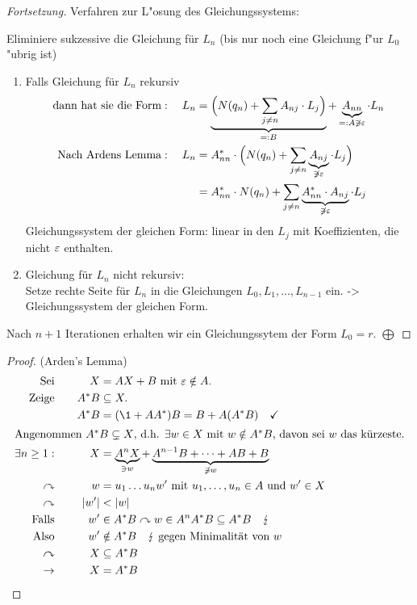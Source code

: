 \begin{proof}[Fortsetzung]
    Verfahren zur L"osung des Gleichungssystems:
    
	Eliminiere sukzessive die Gleichung für $L_n$ (bis nur noch eine Gleichung f"ur $L_0$ "ubrig ist)
	\begin{enumerate}[label=(\arabic*)]
		\item Falls Gleichung für $L_n$ rekursiv
			\begin{align*}
				\text{dann hat sie die Form}:\quad L_n &= \underbrace{\Big( N(q_n)+\sum_{j\neq n} A_{nj}\cdot L_j \Big)}_{=: B} + \underbrace{A_{nn}}_{=: A \not\ni \varepsilon}\cdot L_n\\
				\text{Nach Ardens Lemma}:\quad L_n &= A_{nn}^*\cdot \Big( N(q_n)+\sum_{j\neq n} \underbrace{A_{nj}}_{\not\ni\varepsilon} \cdot L_j \Big)\\
				&= A_{nn}^*\cdot N(q_n) + \sum_{j\neq n} \underbrace{A_{nn}^*\cdot A_{nj}}_{\not\ni\varepsilon} \cdot L_j
			\end{align*}
			Gleichungssystem der gleichen Form: linear in den $L_j$ mit Koeffizienten, die nicht $\varepsilon$ enthalten.
		\item Gleichung für $L_n$ nicht rekursiv:\\
		Setze rechte Seite für $L_n$ in die Gleichungen $L_0, L_1, \dots, L_{n-1}$ ein. \--> Gleichungssystem der gleichen Form.
	\end{enumerate}
    Nach $n+1$ Iterationen erhalten wir ein Gleichungssytem der Form $L_0=r$. \hfill$\bigoplus$
\end{proof}
\begin{proof}(Arden's Lemma)
	\begin{alignat*}{3}
		\text{Sei}&\quad& X&= AX+B\text{ mit }\Eps\notin A.\\
		\text{Zeige}&& A^*B&\subseteq X.\\
		&& A^*B &= (\1+AA^*)B = B+A(A^*B) \quad\checkmark\\
		\shortintertext{Angenommen $A^*B \subsetneq X$, d.h. $\exists w\in X$ mit $w\notin A^*B$, davon sei $w$ das kürzeste.}
		\exists n\geq 1: && X &= \underbrace{A^nX}_{\ni w} + \underbrace{A^{n-1}B+\dots +AB+B}_{\not\ni w}\\
		\curvearrowright && w &= u_1\dots u_n w'\text{ mit } u_1,\dots,u_n\in A\text{ und } w'\in X\\
		\curvearrowright && |w'| &< |w|\\
		\text{Falls}&& w'&\in A^*B \curvearrowright w\in A^nA^*B\subseteq A^*B \quad \lightning\\
		\text{Also} && w'&\notin A^*B \quad\lightning\text{ gegen Minimalität von }w\\
		\curvearrowright && X&\subseteq A^*B\\
		\-> && X &= A^*B \tag*{\qedhere}
	\end{alignat*}
\end{proof}

